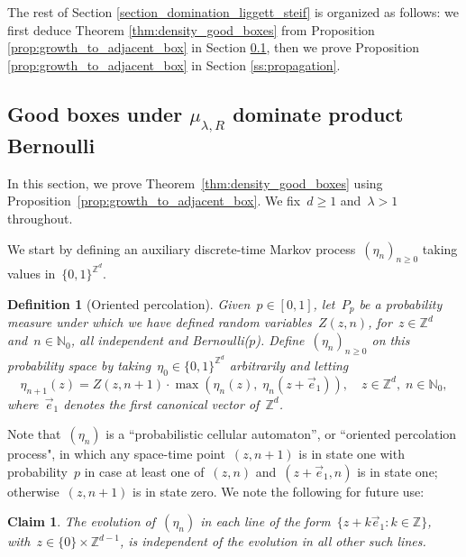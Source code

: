 \documentclass[a4paper,12pt]{article}
\newtheorem  {definition}    [theorem]{Definition}
\newtheorem  {claim}        [theorem]{Claim}
\newcommand{\Z}{\mathbb{Z}}
\begin{document}
The rest of Section \ref{section_domination_liggett_steif} is organized as follows: we first deduce Theorem \ref{thm:density_good_boxes} from Proposition \ref{prop:growth_to_adjacent_box} in Section \ref{ss:domination}, then we prove Proposition \ref{prop:growth_to_adjacent_box} in Section \ref{ss:propagation}.




\subsection{Good boxes under $\mu_{\lambda,R}$ dominate product Bernoulli}
\label{ss:domination}

In this section, we prove Theorem~\ref{thm:density_good_boxes} using Proposition~\ref{prop:growth_to_adjacent_box}. We fix~$d \geq 1$ and~$\lambda > 1$ throughout.




We start by defining an auxiliary discrete-time Markov process~$(\eta_n)_{n \geq 0}$ taking values in~$\{0,1\}^{\Z^d}$.

\begin{definition}[Oriented percolation]\label{def_cellular_automaton}
Given~$p \in [0,1]$, let~$P_p$ be a probability measure under which we have defined random variables~$Z(z,n)$, for~$z \in \mathbb{Z}^d$ and~$n \in \mathbb{N}_0$, all independent and Bernoulli($p$).
 Define~$(\eta_n)_{n \geq 0}$ on this probability space by taking~$\eta_0 \in \{0,1\}^{\Z^d}$ arbitrarily and letting
\begin{equation} \label{eq:def_of_eta}\eta_{n+1}(z) = Z(z,n+1)\cdot \max\left(\eta_n(z),\; \eta_n(z + \vec{e}_1)\right),\quad z \in \mathbb{Z}^d,\; n \in \mathbb{N}_0,\end{equation}
where~$\vec{e}_1$ denotes the first canonical vector of~$\Z^d$.
\end{definition}

  Note that~$(\eta_n)$ is a ``probabilistic cellular automaton'', or ``oriented percolation process", in which any space-time point~$(z,n+1)$ is in state one with probability~$p$ in case at least one of~$(z,n)$ and~$(z+\vec{e}_1,n)$ is in state one; otherwise~$(z,n+1)$ is in state zero. We note the following for future use:
\begin{claim} \label{cl:oriented_percolation}
The evolution of~$(\eta_n)$ in each line of the form~$\{{z + k\vec{e}_1}: k \in \mathbb{Z}\}$, with~$z\in \{0\} \times \mathbb{Z}^{d-1}$, is independent of the evolution in all other such lines.
\end{claim}
\end{document}
